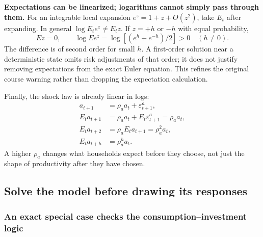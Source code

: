 \begin{blueblock}
\textbf{Expectations can be linearized; logarithms cannot simply pass through them.}
For an integrable local expansion $e^z=1+z+O(z^2)$, take $E_t$ after expanding.
In general $\log E_te^z\ne E_tz$. If $z=+h$ or $-h$ with equal probability,
\[
E z=0,\qquad \log E e^z=\log[(e^h+e^{-h})/2]>0\quad(h\ne0).
\]
The difference is of second order for small $h$. A first-order solution near a
deterministic state omits risk adjustments of that order; it does not justify
removing expectations from the exact Euler equation. This refines the original
course warning rather than dropping the expectation calculation.
\end{blueblock}

Finally, the shock law is already linear in logs:
\begin{align}
a_{t+1}&=\rho_a a_t+\varepsilon_{t+1}^a,\\
E_ta_{t+1}&=\rho_a a_t+E_t\varepsilon_{t+1}^a=\rho_a a_t,\\
E_ta_{t+2}&=\rho_a E_ta_{t+1}=\rho_a^2a_t,\\
E_ta_{t+h}&=\rho_a^h a_t.
\end{align}
A higher $\rho_a$ changes what households expect before they choose, not just
the shape of productivity after they have chosen.

\subsection{Solve the model before drawing its responses}\label{sec:rbc-solve}

\subsubsection{An exact special case checks the consumption--investment logic}

